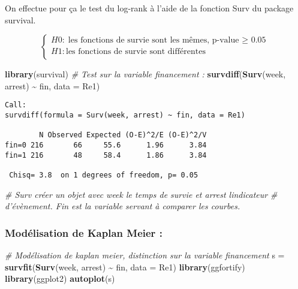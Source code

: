 \documentclass[
]{article}
\newenvironment{Shaded}{\begin{snugshade}}{\end{snugshade}}
\newcommand{\AttributeTok}[1]{\textcolor[rgb]{0.13,0.29,0.53}{#1}}
\newcommand{\CommentTok}[1]{\textcolor[rgb]{0.56,0.35,0.01}{\textit{#1}}}
\newcommand{\FunctionTok}[1]{\textcolor[rgb]{0.13,0.29,0.53}{\textbf{#1}}}
\newcommand{\NormalTok}[1]{#1}
\newcommand{\OtherTok}[1]{\textcolor[rgb]{0.56,0.35,0.01}{#1}}
\newcommand{\SpecialCharTok}[1]{\textcolor[rgb]{0.81,0.36,0.00}{\textbf{#1}}}
\begin{document}
On effectue pour ça le test du log-rank à l'aide de la fonction Surv du
package survival.

\[
\left\{
\begin{array}{l}
H0 : \text{les fonctions de survie sont les mêmes,  p-value $\geq$ 0.05} \\
H1 : \text{les fonctions de survie sont différentes} \\
\end{array}
\right.
\]

\begin{Shaded}
\begin{Highlighting}[]
\FunctionTok{library}\NormalTok{(survival)}
\CommentTok{\# Test sur la variable financement : }
\FunctionTok{survdiff}\NormalTok{(}\FunctionTok{Surv}\NormalTok{(week, arrest) }\SpecialCharTok{\textasciitilde{}}\NormalTok{ fin, }\AttributeTok{data =}\NormalTok{ Re1)}
\end{Highlighting}
\end{Shaded}

\begin{verbatim}
Call:
survdiff(formula = Surv(week, arrest) ~ fin, data = Re1)

        N Observed Expected (O-E)^2/E (O-E)^2/V
fin=0 216       66     55.6      1.96      3.84
fin=1 216       48     58.4      1.86      3.84

 Chisq= 3.8  on 1 degrees of freedom, p= 0.05 
\end{verbatim}

\begin{Shaded}
\begin{Highlighting}[]
\CommentTok{\# Surv créer un objet avec week le temps de survie et arrest l\textquotesingle{}indicateur }
\CommentTok{\# d’évènement. Fin est la variable servant à comparer les courbes. }
\end{Highlighting}
\end{Shaded}

\hypertarget{moduxe9lisation-de-kaplan-meier}{%
\subsubsection{Modélisation de Kaplan Meier
:}\label{moduxe9lisation-de-kaplan-meier}}

\begin{Shaded}
\begin{Highlighting}[]
\CommentTok{\# Modélisation de kaplan meier, distinction sur la variable financement }
\NormalTok{s }\OtherTok{=} \FunctionTok{survfit}\NormalTok{(}\FunctionTok{Surv}\NormalTok{(week, arrest) }\SpecialCharTok{\textasciitilde{}}\NormalTok{ fin, }\AttributeTok{data =}\NormalTok{ Re1)}
\FunctionTok{library}\NormalTok{(ggfortify)}
\FunctionTok{library}\NormalTok{(ggplot2)}
\FunctionTok{autoplot}\NormalTok{(s) }
\end{Highlighting}
\end{Shaded}
\end{document}
